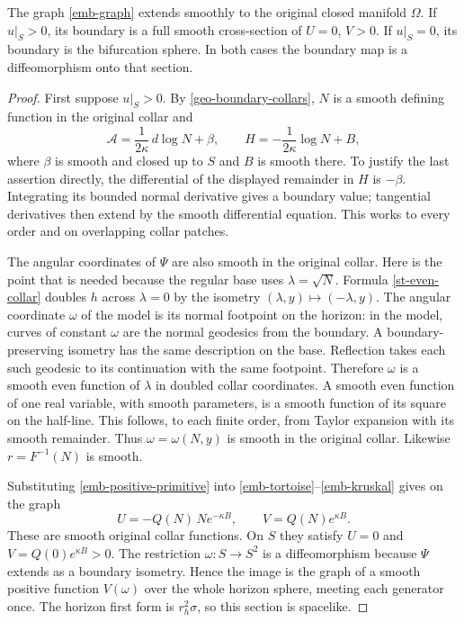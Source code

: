 \begin{lemma}
\label{emb-horizon}
The graph \eqref{emb-graph} extends smoothly to the original closed
manifold $\Omega$.  If $u|_S>0$, its boundary is a full smooth
cross-section of $U=0$, $V>0$.  If $u|_S=0$, its boundary is
the bifurcation sphere.  In both cases the boundary map is a
diffeomorphism onto that section.
\end{lemma}

\begin{proof}
First suppose $u|_S>0$.  By \cref{geo-boundary-collars},
$N$ is a smooth defining function in the original collar and
\begin{equation}
 \mathcal A=\frac1{2\kappa}\,d\log N+\beta,\qquad
 H=-\frac1{2\kappa}\log N+B ,
 \label{emb-positive-primitive}
\end{equation}
where $\beta$ is smooth and closed up to $S$ and $B$ is smooth
there.  To justify the last assertion directly, the differential of
the displayed remainder in $H$ is $-\beta$.  Integrating its bounded
normal derivative gives a boundary value; tangential derivatives
then extend by the smooth differential equation.  This works to
every order and on overlapping collar patches.

The angular coordinates of $\Psi$ are also smooth in the original
collar.  Here is the point that is needed because the regular base
uses $\lambda=\sqrt N$.  Formula \eqref{st-even-collar} doubles $h$
across $\lambda=0$ by the isometry
$(\lambda,y)\mapsto(-\lambda,y)$.  The angular coordinate $\omega$
of the model is its normal footpoint on the horizon: in the model,
curves of constant $\omega$ are the normal geodesics from the
boundary.  A boundary-preserving isometry has the same description
on the base.  Reflection takes each such geodesic to its continuation
with the same footpoint.  Therefore $\omega$ is a smooth even
function of $\lambda$ in doubled collar coordinates.  A smooth
even function of one real variable, with smooth parameters, is a
smooth function of its square on the half-line.  This follows, to
each finite order, from Taylor expansion with its smooth remainder.
Thus $\omega=\omega(N,y)$ is smooth in the original collar.
Likewise $r=F^{-1}(N)$ is smooth.

Substituting \eqref{emb-positive-primitive} into
\eqref{emb-tortoise}--\eqref{emb-kruskal} gives on the graph
\begin{equation}
 U=-Q(N)\,N e^{-\kappa B},\qquad
 V=Q(N)e^{\kappa B}.
 \label{emb-positive-kruskal}
\end{equation}
These are smooth original collar functions.  On $S$ they satisfy
$U=0$ and $V=Q(0)e^{\kappa B}>0$.  The restriction
$\omega:S\to S^2$ is a diffeomorphism because $\Psi$ extends
as a boundary isometry.  Hence the image is the graph of a smooth
positive function $V(\omega)$ over the whole horizon sphere, meeting
each generator once.  The horizon first form is $r_h^2\sigma$,
so this section is spacelike.


\end{proof}
